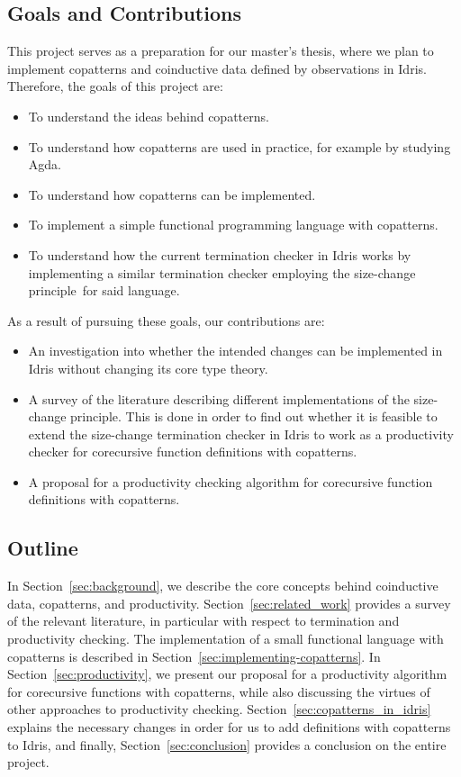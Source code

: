 \subsection{Goals and Contributions}
This project serves as a preparation for our master's thesis, where we plan to implement copatterns and coinductive data defined by observations in Idris. Therefore, the goals of this project are:

\begin{itemize}
\item To understand the ideas behind copatterns.
\item To understand how copatterns are used in practice, for example by studying Agda.
\item To understand how copatterns can be implemented.
\item To implement a simple functional programming language with copatterns.
\item To understand how the current termination checker in Idris works by implementing a similar termination checker employing the size-change principle\,\citep{LeeJones01SizeChange} for said language.
\end{itemize}

As a result of pursuing these goals, our contributions are:

\begin{itemize}
\item An investigation into whether the intended changes can be implemented in Idris without changing its core type theory.
\item A survey of the literature describing different implementations of the size-change principle. This is done in order to find out whether it is feasible to extend the size-change termination checker in Idris to work as a productivity checker for corecursive function definitions with copatterns.
\item A proposal for a productivity checking algorithm for corecursive function definitions with copatterns.
\end{itemize} 

\subsection{Outline}
In Section~\ref{sec:background}, we describe the core concepts behind coinductive data, copatterns, and productivity. Section~\ref{sec:related_work} provides a survey of the relevant literature, in particular with respect to termination and productivity checking. The implementation of a small functional language with copatterns is described in Section~\ref{sec:implementing-copatterns}. In Section~\ref{sec:productivity}, we present our proposal for a productivity algorithm for corecursive functions with copatterns, while also discussing the virtues of other approaches to productivity checking. Section~\ref{sec:copatterns_in_idris} explains the necessary changes in order for us to add definitions with copatterns to Idris, and finally, Section~\ref{sec:conclusion} provides a conclusion on the entire project.

